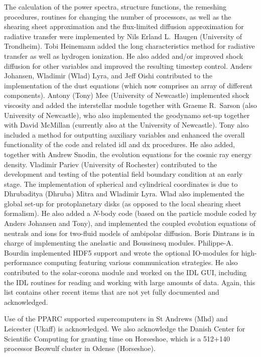 \documentclass[\mydriver,12pt,twoside,notitlepage,a4paper]{article}
\begin{document}
The calculation of the power spectra, structure functions,
the remeshing procedures,
routines for changing the number of processors, as well as
the shearing sheet approximation and the flux-limited diffusion
approximation for radiative transfer
were implemented by Nils Erland L.\ Haugen (University of Trondheim).
Tobi Heinemann added the long characteristics method for
radiative transfer as well as hydrogen ionization.
He also added and/or improved shock diffusion for other variables
and improved the resulting timestep control.
Anders Johansen, Wladimir (Wlad) Lyra, and Jeff Oishi contributed
to the implementation of
the dust equations (which now comprises an array of different components).
Antony (Tony) Mee (University of Newcastle) implemented shock viscosity
and added the interstellar module together with
Graeme R.\ Sarson (also University of Newcastle), who also implemented
the geodynamo set-up together with David McMillan
(currently also at the University of Newcastle).
Tony also included a method for outputting auxiliary variables and
enhanced the overall functionality of the code and related idl and dx
procedures.
He also added, together with Andrew Snodin, the evolution equations
for the cosmic ray energy density.
Vladimir Pariev (University of Rochester) contributed to the development
and testing of the potential field boundary condition at an early stage.
The implementation of spherical and cylindrical coordinates is due
to Dhrubaditya (Dhruba) Mitra and Wladimir Lyra. Wlad also
implemented the global set-up for protoplanetary
disks (as opposed to the local shearing sheet formalism). He also added a
$N$-body code (based on the particle module coded by Anders Johansen
and Tony), and implemented the coupled evolution equations of neutrals and
ions for two-fluid models of ambipolar diffusion.
Boris Dintrans is in charge of implementing the anelastic and Boussinesq modules.
Philippe-A. Bourdin implemented HDF5 support and wrote the optional IO-modules
for high-performance computing featuring various communication strategies.
He also contributed to the solar-corona module and worked on the IDL GUI,
including the IDL routines for reading and working with large amounts of data.
Again, this list contains other recent items that are not yet fully
documented and acknowledged.

Use of the PPARC supported supercomputers in St Andrews (Mhd) and
Leicester (Ukaff) is acknowledged. We also acknowledge the Danish Center
for Scientific Computing for granting time on Horseshoe, which is a
512+140 processor Beowulf cluster in Odense (Horseshoe).
\end{document}
